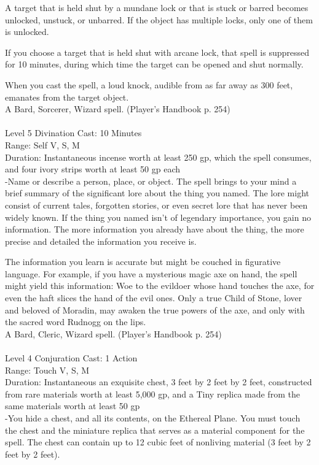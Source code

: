 \documentclass[10pt,twocolumn]{report}
\begin{document}
A target that is held shut by a mundane lock or that is stuck or barred becomes unlocked, unstuck, or unbarred. If the object has multiple locks, only one of them is unlocked.

If you choose a target that is held shut with arcane lock, that spell is suppressed for 10 minutes, during which time the target can be opened and shut normally.

When you cast the spell, a loud knock, audible from as far away as 300 feet, emanates from the target object.\\
A Bard, Sorcerer, Wizard spell. (Player's Handbook p. 254) \\


 \\
Level 5 \quad Divination \quad Cast: 10 Minutes\\
Range: Self \quad V, S, M\\
Duration: Instantaneous \quad incense worth at least 250 gp, which the spell consumes, and four ivory strips worth at least 50 gp each\\
-Name or describe a person, place, or object. The spell brings to your mind a brief summary of the significant lore about the thing you named. The lore might consist of current tales, forgotten stories, or even secret lore that has never been widely known. If the thing you named isn’t of legendary importance, you gain no information. The more information you already have about the thing, the more precise and detailed the information you receive is.

The information you learn is accurate but might be couched in figurative language. For example, if you have a mysterious magic axe on hand, the spell might yield this information: Woe to the evildoer whose hand touches the axe, for even the haft slices the hand of the evil ones. Only a true Child of Stone, lover and beloved of Moradin, may awaken the true powers of the axe, and only with the sacred word Rudnogg on the lips.\\
A Bard, Cleric, Wizard spell. (Player's Handbook p. 254) \\


 \\
Level 4 \quad Conjuration \quad Cast: 1 Action\\
Range: Touch \quad V, S, M\\
Duration: Instantaneous \quad an exquisite chest, 3 feet by 2 feet by 2 feet, constructed from rare materials worth at least 5,000 gp, and a Tiny replica made from the same materials worth at least 50 gp\\
-You hide a chest, and all its contents, on the Ethereal Plane.
You must touch the chest and the miniature replica that serves as a material component for the spell. The chest can contain up to 12 cubic feet of nonliving material (3 feet by 2 feet by 2 feet).
\end{document}
